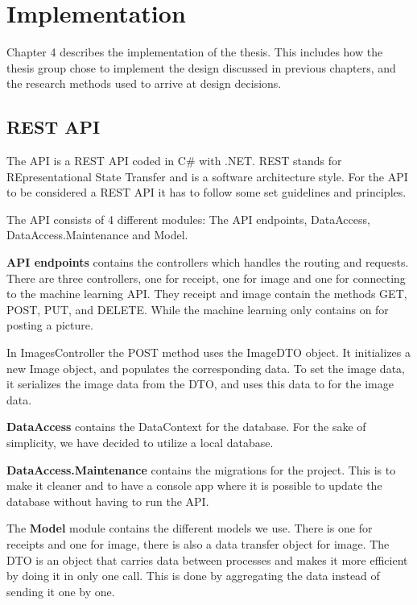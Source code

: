 \cleardoublepage
\chapter{Implementation}
\label{ch:implementation}
Chapter 4 describes the implementation of the thesis.
This includes how the thesis group chose to implement the design discussed in previous chapters, and the research methods used to arrive at design decisions.

\section{REST API}\label{sec:REST API}

The API is a REST API coded in C\# with .NET\@.
REST stands for REpresentational State Transfer and is a software architecture style.
For the API to be considered a REST API it has to follow some set guidelines and principles.

The API consists of 4 different modules: The API endpoints, DataAccess,\\
DataAccess.Maintenance and Model.

\textbf{API endpoints} contains the controllers which handles the routing and requests.
There are three controllers, one for receipt, one for image and one for connecting to the machine learning API\@.
They receipt and image contain the methods GET, POST, PUT, and DELETE\@.
While the machine learning only contains on  for posting a picture.

In ImagesController the POST method uses the ImageDTO object.
It initializes a new Image object, and populates the corresponding data.
To set the image data, it serializes the image data from the DTO, and uses this data to for the image data.

\textbf{DataAccess} contains the DataContext for the database.
For the sake of simplicity, we have decided to utilize a local database.

\textbf{DataAccess.Maintenance} contains the migrations for the project.
This is to make it cleaner and to have a console app where it is possible to update the database without having to run the API\@.

The \textbf{Model} module contains the different models we use.
There is one for receipts and one for image, there is also a data transfer object for image.
The DTO is an object that carries data between processes and makes it more efficient by doing it in only one call.
This is done by aggregating the data instead of sending it one by one.


